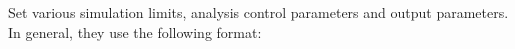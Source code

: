 


\label{Options_Reference}

    

Set various simulation limits, analysis control parameters
and output parameters.  In general, they use the following format:


